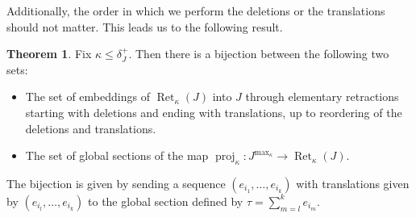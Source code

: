 \documentclass[11pt]{article}
\theoremstyle{definition}
\newtheorem{theorem}{Theorem}[section]
\theoremstyle{remark}
\newcommand{\delplus}{\delta_J^+}
\DeclareMathOperator{\proj}{proj}              %
\newcommand{\kproj}{\proj_{\kappa}}            %
\DeclareMathOperator{\Ret}{Ret}                %
\newcommand{\RetK}{\Ret_{\kappa}}              %
\newcommand{\Jmax}{J^{\max_{\kappa}}}
\begin{document}
Additionally, the order in which we perform the deletions or the translations should not matter. This leads us to the following result.
\begin{theorem} \label{theorem:sections_and_embedded_minors}
    Fix $\kappa \leq \delplus$. Then there is a bijection between the following two sets:
    \begin{itemize}        
        \item The set of embeddings of $\RetK(J)$ into $J$ through elementary retractions starting with deletions and ending with translations, up to reordering of the deletions and translations.
        \item The set of global sections of the map $\kproj:\Jmax \to \RetK(J)$.
    \end{itemize}
    The bijection is given by sending a sequence $(e_{i_1},\dots,e_{i_k})$ with translations given by $(e_{i_l},\dots,e_{i_k})$ to the global section defined by $\tau = \sum_{m=l}^k e_{i_m}$.
\end{theorem}
\end{document}

